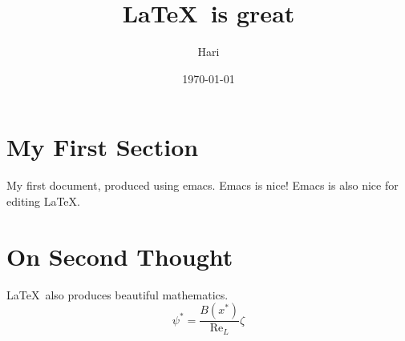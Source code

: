 \documentclass{article}
\begin{document}
\title{\LaTeX\ is great}
\author{Hari}
\date{\today}
\maketitle

\section{My First Section}

My first document, produced using emacs.  Emacs is nice!
Emacs is also nice for editing \LaTeX.

\section{On Second Thought}

\LaTeX\ also  produces beautiful mathematics.
\begin{equation}
\psi^\ast = \frac{B(x^\ast)}{\mathrm{Re}_L}\zeta
\end{equation}
\end{document}
